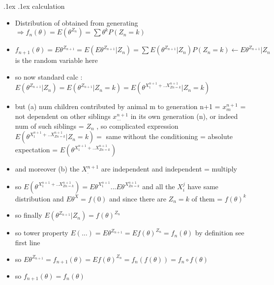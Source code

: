 \documentclass[10pt,landscape,a4paper]{article}
\makeatletter
\renewcommand{\subsection}{\@startsection{subsection}{1}{0mm}%
                                {.1ex}%
                                {.1ex}%
                                {\sffamily\bfseries}}
\makeatother
\begin{document}
\begin{multicols*}{3}
\begin{spacing}{0.5}
\subsection{calculation}
\begin{itemize}

\item Distribution of  obtained from generating $ \Rightarrow f_n(\theta)  =  E(\theta^{Z_n}) = \sum \theta^k \boxed{ P(Z_n=k) }$ \\
\item $ f_{n+1}(\theta) = E  \theta^{Z_{n+1} } = E \left(  \boxed{E\theta^{Z_{n+1}}|Z_n} \right) = \sum \boxed{E  \left( \theta^{Z_{n+1}} | Z_n    \right)}  P(Z_n=k) \leftarrow \boxed{E  \theta^{Z_{n+1}} | Z_n}     $ is the random variable here \\
\item so now standard calc : $E  \left( \theta^{Z_{n+1}} | Z_n    \right) = E  \left( \theta^{Z_{n+1}} | Z_n=k    \right) = E  \left( \theta^{X_1^{n+1} + .. X_{Zn=k}^{n+1}} | Z_n=k    \right) $ \\
\item but (a) num children contributed by animal m  to generation n+1 = $x_m^{n+1}$ = not dependent on other siblings $x_{...}^{n+1}$ in its own generation (n), or indeed num of such siblings = $Z_n$ , so complicated expression $E  \left( \theta^{X_1^{n+1} + .. X_{Zn=k}^{n+1}} | Z_n=k    \right) = $ same without the conditioning = absolute expectation = $E  \left( \theta^{X_1^{n+1} + .. X_{Zn=k}^{n+1}} \right)$\\
\item and moreover (b) the $X_{.}^{n+1}$ are independent and independent = multiply 
\item  so $E  \left( \theta^{X_1^{n+1} + .. X_{Zn=k}^{n+1}} \right) = E\theta^{X_1^{n+1}} ... E\theta^{X_{Zn=k}^{n+1}} $ and all the $X_i^j$ have same distribution and $E\theta^X=f(0)$ and since there are $Z_n=k$ of them = ${f(\theta)}^k$\\
\item so finally $E  \left( \theta^{Z_{n+1}} | Z_n    \right) = {f(\theta)}^{Z_n}$ \\
\item so tower property $E (...)  = E \theta^{Z_{n+1}} = E {f(\theta)}^{Z_n} = f_n(\theta) $ by definition see first line \\
\item so $ E \theta^{Z_{n+1}} = f_{n+1}(\theta) = E {f(\theta)}^{Z_n} = f_n( f(\theta)) = f_n \circ f (\theta)$ \\
\item so  $\boxed{f_{n+1}(\theta) = f_{n}(\theta)}$


\end{itemize}
\end{spacing}
\end{multicols*}
\end{document}
